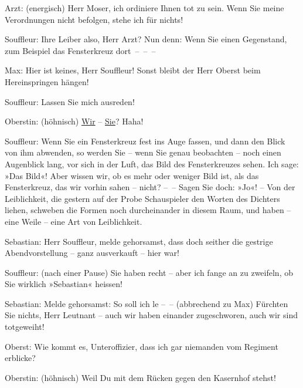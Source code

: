 \pstart
           Arzt: (energisch) Herr Moser, ich ordiniere Ihnen tot zu sein. Wenn Sie meine
               Verordnungen nicht befolgen, stehe ich für nichts!\pend
           
\pstart
           Souffleur: Ihre Leiber also, Herr Arzt? Nun denn: Wenn Sie einen Gegenstand, zum
               Beispiel das Fensterkreuz dort – – –\pend
           
\pstart
           Max: Hier ist keines, Herr Souffleur! Sonst bleibt der Herr Oberst beim
               Hereinspringen hängen!\pend
           
\pstart
           {\pb}Souffleur: Lassen Sie mich
               ausreden!\pend
           
\pstart
           Oberstin: (höhnisch) \uline{Wir} – \uline{Sie}? Haha!\pend
           
\pstart
           Souffleur: Wenn Sie ein Fensterkreuz fest ins Auge fassen, und dann den Blick von ihm
               abwenden, so werden Sie – wenn Sie genau beobachten – noch einen Augenblick lang, vor
               sich in der Luft, das Bild des Fensterkreuzes sehen. Ich sage: »Das Bild«! Aber
               wissen wir, ob es mehr oder weniger Bild ist, als das Fensterkreuz, das wir vorhin
               sahen – nicht? – – Sagen Sie doch: »Jo«! – Von der Leiblichkeit, die gestern auf der
               Probe Schauspieler den Worten des Dichters liehen, schweben die Formen noch
               durcheinander in diesem Raum, und haben – eine Weile – eine Art von Leiblichkeit.\pend
           
\pstart
           Sebastian: Herr Souffleur, melde gehorsamst, dass doch seither die gestrige
               Abendvorstellung – ganz ausverkauft – hier war!\pend
           
\pstart
           Souffleur: (nach einer Pause) Sie haben recht – aber ich fange an zu zweifeln, ob Sie
               wirklich »Sebastian« heissen!\pend
           
\pstart
           Sebastian: Melde gehorsamst: So soll ich le – – (abbrechend zu Max) Fürchten Sie
               nichts, Herr Leutnant – auch wir haben einander zugeschworen, auch wir sind
               totgeweiht!\pend
           
\pstart
           Oberst: Wie kommt es, Unteroffizier, dass ich gar niemanden vom Regiment
               erblicke?\pend
           
\pstart
           Oberstin: (höhnisch) Weil Du mit dem Rücken gegen den Kasernhof stehst!\pend
           
